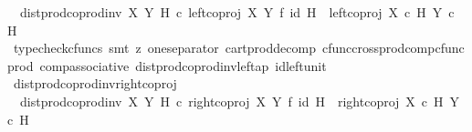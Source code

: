 \begin{isabellebody}
\ \ {\isachardoublequoteopen}dist{\isacharunderscore}{\kern0pt}prod{\isacharunderscore}{\kern0pt}coprod{\isacharunderscore}{\kern0pt}inv{}\ X\ Y\ H\ {\isasymcirc}\isactrlsub c\ {\isacharparenleft}{\kern0pt}left{\isacharunderscore}{\kern0pt}coproj\ X\ Y\ {\isasymtimes}\isactrlsub f\ id\ H{\isacharparenright}{\kern0pt}\ {\isacharequal}{\kern0pt}\ left{\isacharunderscore}{\kern0pt}coproj\ {\isacharparenleft}{\kern0pt}X\ {\isasymtimes}\isactrlsub c\ H{\isacharparenright}{\kern0pt}\ {\isacharparenleft}{\kern0pt}Y\ {\isasymtimes}\isactrlsub c\ H{\isacharparenright}{\kern0pt}{\isachardoublequoteclose}\isanewline
%
\isadelimproof
\ \ %
\endisadelimproof
%
\isatagproof
{}\isamarkupfalse%
\ {\isacharparenleft}{\kern0pt}typecheck{\isacharunderscore}{\kern0pt}cfuncs{\isacharcomma}{\kern0pt}\ smt\ {\isacharparenleft}{\kern0pt}z{}{\isacharparenright}{\kern0pt}\ one{\isacharunderscore}{\kern0pt}separator\ cart{\isacharunderscore}{\kern0pt}prod{\isacharunderscore}{\kern0pt}decomp\ cfunc{\isacharunderscore}{\kern0pt}cross{\isacharunderscore}{\kern0pt}prod{\isacharunderscore}{\kern0pt}comp{\isacharunderscore}{\kern0pt}cfunc{\isacharunderscore}{\kern0pt}prod\ comp{\isacharunderscore}{\kern0pt}associative{}\ dist{\isacharunderscore}{\kern0pt}prod{\isacharunderscore}{\kern0pt}coprod{\isacharunderscore}{\kern0pt}inv{}{\isacharunderscore}{\kern0pt}left{\isacharunderscore}{\kern0pt}ap\ id{\isacharunderscore}{\kern0pt}left{\isacharunderscore}{\kern0pt}unit{}{\isacharparenright}{\kern0pt}%
\endisatagproof
{\isafoldproof}%
%
\isadelimproof
\isanewline
%
\endisadelimproof
\isanewline
{}\isamarkupfalse%
\ dist{\isacharunderscore}{\kern0pt}prod{\isacharunderscore}{\kern0pt}coprod{\isacharunderscore}{\kern0pt}inv{}{\isacharunderscore}{\kern0pt}right{\isacharunderscore}{\kern0pt}coproj{\isacharcolon}{\kern0pt}\isanewline
\ \ {\isachardoublequoteopen}dist{\isacharunderscore}{\kern0pt}prod{\isacharunderscore}{\kern0pt}coprod{\isacharunderscore}{\kern0pt}inv{}\ X\ Y\ H\ {\isasymcirc}\isactrlsub c\ {\isacharparenleft}{\kern0pt}right{\isacharunderscore}{\kern0pt}coproj\ X\ Y\ {\isasymtimes}\isactrlsub f\ id\ H{\isacharparenright}{\kern0pt}\ {\isacharequal}{\kern0pt}\ right{\isacharunderscore}{\kern0pt}coproj\ {\isacharparenleft}{\kern0pt}X\ {\isasymtimes}\isactrlsub c\ H{\isacharparenright}{\kern0pt}\ {\isacharparenleft}{\kern0pt}Y\ {\isasymtimes}\isactrlsub c\ H{\isacharparenright}{\kern0pt}{\isachardoublequoteclose}\isanewline
%
\isadelimproof
\ \ %
\endisadelimproof
%
\isatagproof

\end{isabellebody}
